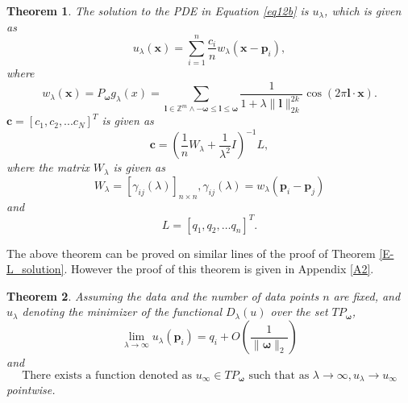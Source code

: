 \documentclass[multixcb]{amstext-l}
\theoremstyle{plain}
\newtheorem{theorem}{Theorem}[chapter]
\theoremstyle{definition}
\theoremstyle{definition}
\theoremstyle{remark}
\numberwithin{equation}{chapter}
\begin{document}



\begin{theorem}\label{exp_min_TP}
The solution to the PDE in Equation \ref{eq12b} is $u_{\lambda}$, which is given as
\begin{equation}
    \label{exp_th2}  
  u_{\lambda}(\boldsymbol{x}) = \sum\limits_{i=1}^n \frac{c_i}{n}w_{\lambda}(\boldsymbol{x}-\boldsymbol{p}_i),
 \end{equation}
 where
 \begin{equation}\label{eq22_th2}
    w_{\lambda}(\boldsymbol{x}) = P_{\boldsymbol{\omega}}g_{\lambda}(x) = \sum_{\boldsymbol{l}\in\mathbb{Z}^m \land -\boldsymbol{\omega} \le \boldsymbol{l}\le \boldsymbol{\omega} } \frac{1}{1+\lambda\|\boldsymbol{l}\|_{2k}^{2k}} \cos{(2\pi\boldsymbol{l}\cdot\boldsymbol{x})}.
\end{equation}
$\pmb{c} = [c_1,c_2,...c_{N}]^T$ is given as \begin{equation}\label{eq28_th2}
 \pmb{c} = (\frac{1}{n}W_{\lambda}+\frac{1}{\lambda^2}I)^{-1}L,\end{equation} where the matrix $W_{\lambda}$ is given as 
\begin{equation}\label{eq29_th2}
  W_{\lambda} = [\gamma_{ij}(\lambda)]_{n\times n},\gamma_{ij}(\lambda) = w_{\lambda}(\boldsymbol{p}_i-\boldsymbol{p}_j)\end{equation} and $$L = [q_1,q_2,\ldots q_n]^T.$$ 
\end{theorem}
The above theorem can be proved on similar lines of the proof of Theorem \ref{E-L_solution}. However the proof of this theorem is given in Appendix \ref{A2}.

\begin{theorem}
\label{interpolation theorem 2}
Assuming the data and the number of data points $n$ are fixed, and $u_{\lambda}$ denoting the minimizer of the functional $D_{\lambda}(u)$ over the set $TP_{\boldsymbol{\omega}}$, \begin{equation}\label{eq35p}\lim\limits_{\lambda \to \infty} u_{\lambda}(\boldsymbol{p}_i) = q_i + O(\frac{1}{\|\boldsymbol{\omega}\|_2})\end{equation} and  \begin{equation}\label{eq36p}\mbox{There exists a function denoted as }u_{\infty} \in TP_{\boldsymbol{\omega}} \mbox{ such that as }\lambda\to\infty, u_{\lambda} \to u_{\infty}\end{equation} pointwise.
\end{theorem}
\end{document}
